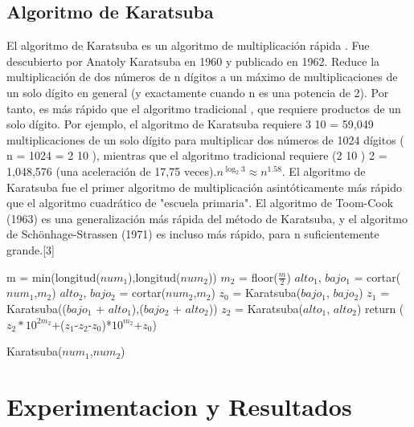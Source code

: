 \documentclass[spanish]{article}
\begin{document}
	\subsection*{Algoritmo de Karatsuba}	
	El algoritmo de Karatsuba es un algoritmo de multiplicación rápida . Fue descubierto por Anatoly Karatsuba en 1960 y publicado en 1962. Reduce la multiplicación de dos números de n dígitos a un máximo de multiplicaciones de un solo dígito en general (y exactamente cuando n es una potencia de 2). Por tanto, es más rápido que el algoritmo tradicional , que requiere productos de un solo dígito. Por ejemplo, el algoritmo de Karatsuba requiere 3 10 = 59,049 multiplicaciones de un solo dígito para multiplicar dos números de 1024 dígitos ( n = 1024 = 2 10 ), mientras que el algoritmo tradicional requiere (2 10 ) 2 = 1,048,576 (una aceleración de 17,75 veces).$n^{\log_2{3}} \approx n^{1.58}$.
	El algoritmo de Karatsuba fue el primer algoritmo de multiplicación asintóticamente más rápido que el algoritmo cuadrático de "escuela primaria". El algoritmo de Toom-Cook (1963) es una generalización más rápida del método de Karatsuba, y el algoritmo de Schönhage-Strassen (1971) es incluso más rápido, para n suficientemente grande.[3]
	\begin{algorithm}[H]
		m = min(longitud($num_1$),longitud($num_2$))\;
		$m_2$ = floor($\frac{m}{2}$)\;
		$alto_1$, $bajo_1$ = cortar($num_1$,$m_2$)\;
		$alto_2$, $bajo_2$ = cortar($num_2$,$m_2$)\;		
		$z_0$ = Karatsuba($bajo_1$, $bajo_2$)\;
		$z_1$ = Karatsuba(($bajo_1$ + $alto_1$),($bajo_2$ + $alto_2$))\;
		$z_2$ = Karatsuba($alto_1$, $alto_2$)\;
		return ($z_2*10^{2m_2}$+($z_1$-$z_2$-$z_0$)*$10^{m_2}$+$z_0$)
		\caption{Karatsuba($num_1$,$num_2$)}
	\end{algorithm}
	\section{Experimentacion y Resultados}
\end{document}
